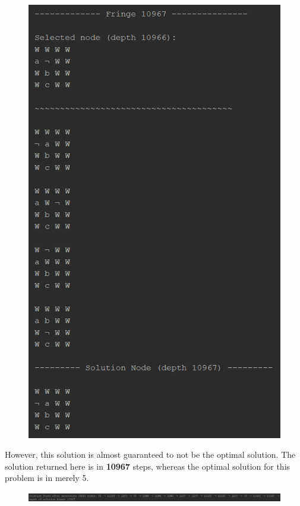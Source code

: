 \documentclass{article}
\begin{document}
	\begin{figure}[h]	
		\centering
		\includegraphics[height=0.7\textheight,keepaspectratio]{DFS-2-3.png}
	\end{figure}

	However, this solution is almost guaranteed to not be the optimal solution. The solution returned here is in \textbf{10967} steps, whereas the optimal solution for this problem is in merely 5.
	
	\begin{figure}[h]	
		\centering
		\includegraphics[width=\textwidth,keepaspectratio]{DFS-2-4.png}
	\end{figure}
\end{document}
